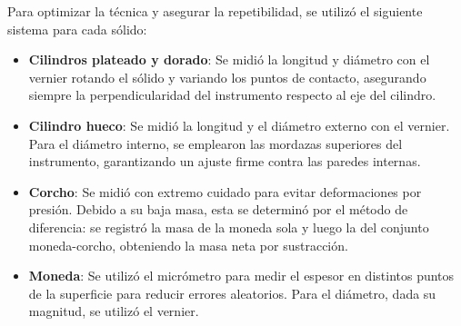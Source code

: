 Para optimizar la técnica y asegurar la repetibilidad, se utilizó el siguiente sistema para cada sólido:
\begin{itemize}
    \item \textbf{Cilindros plateado y dorado}: Se midió la longitud y diámetro con el vernier rotando el sólido y variando los puntos de contacto, asegurando siempre la perpendicularidad del instrumento respecto al eje del cilindro. 
    \item \textbf{Cilindro hueco}: Se midió la longitud y el diámetro externo con el vernier. Para el diámetro interno, se emplearon las mordazas superiores del instrumento, garantizando un ajuste firme contra las paredes internas.
    \item \textbf{Corcho}: Se midió con extremo cuidado para evitar deformaciones por presión. Debido a su baja masa, esta se determinó por el método de diferencia: se registró la masa de la moneda sola y luego la del conjunto moneda-corcho, obteniendo la masa neta por sustracción. 
    \item \textbf{Moneda}: Se utilizó el micrómetro para medir el espesor en distintos puntos de la superficie para reducir errores aleatorios. Para el diámetro, dada su magnitud, se utilizó el vernier. 
\end{itemize}
